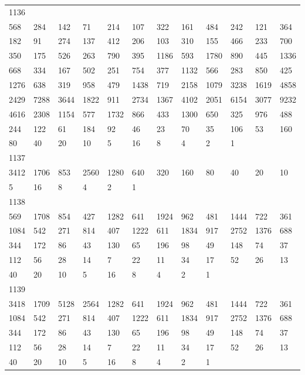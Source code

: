 \begin{longtable}{llllllllllll}
1136&&&&&&&&&&&\\
568& 284& 142& 71& 214& 107& 322& 161& 484& 242& 121& 364\\
182& 91& 274& 137& 412& 206& 103& 310& 155& 466& 233& 700\\
350& 175& 526& 263& 790& 395& 1186& 593& 1780& 890& 445& 1336\\
668& 334& 167& 502& 251& 754& 377& 1132& 566& 283& 850& 425\\
1276& 638& 319& 958& 479& 1438& 719& 2158& 1079& 3238& 1619& 4858\\
2429& 7288& 3644& 1822& 911& 2734& 1367& 4102& 2051& 6154& 3077& 9232\\
4616& 2308& 1154& 577& 1732& 866& 433& 1300& 650& 325& 976& 488\\
244& 122& 61& 184& 92& 46& 23& 70& 35& 106& 53& 160\\
80& 40& 20& 10& 5& 16& 8& 4& 2& 1& \\

1137&&&&&&&&&&&\\
3412& 1706& 853& 2560& 1280& 640& 320& 160& 80& 40& 20& 10\\
5& 16& 8& 4& 2& 1& \\

1138&&&&&&&&&&&\\
569& 1708& 854& 427& 1282& 641& 1924& 962& 481& 1444& 722& 361\\
1084& 542& 271& 814& 407& 1222& 611& 1834& 917& 2752& 1376& 688\\
344& 172& 86& 43& 130& 65& 196& 98& 49& 148& 74& 37\\
112& 56& 28& 14& 7& 22& 11& 34& 17& 52& 26& 13\\
40& 20& 10& 5& 16& 8& 4& 2& 1& \\

1139&&&&&&&&&&&\\
3418& 1709& 5128& 2564& 1282& 641& 1924& 962& 481& 1444& 722& 361\\
1084& 542& 271& 814& 407& 1222& 611& 1834& 917& 2752& 1376& 688\\
344& 172& 86& 43& 130& 65& 196& 98& 49& 148& 74& 37\\
112& 56& 28& 14& 7& 22& 11& 34& 17& 52& 26& 13\\
40& 20& 10& 5& 16& 8& 4& 2& 1& \\


\end{longtable}
